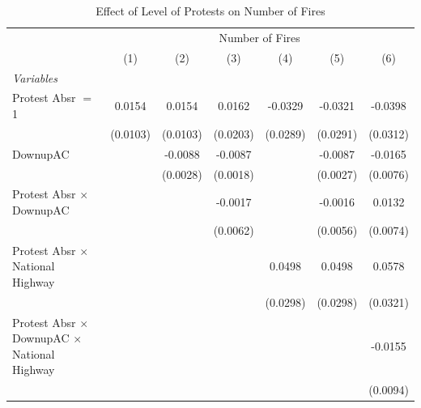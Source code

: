 
\begin{table}[htbp]
   \caption{\label{tab:protest_treat_main} Effect of Level of Protests on Number of Fires}
   \centering
   \begin{tabular}{lcccccc}
      \tabularnewline \midrule \midrule
       & \multicolumn{6}{c}{Number of Fires}\\
                                                                 & (1)           & (2)           & (3)           & (4)           & (5)           & (6)\\  
      \midrule
      \emph{Variables}\\
      Protest Absr $=$ 1                                         & 0.0154        & 0.0154        & 0.0162        & -0.0329       & -0.0321       & -0.0398\\   
                                                                 & (0.0103)      & (0.0103)      & (0.0203)      & (0.0289)      & (0.0291)      & (0.0312)\\   
      DownupAC                                                   &               & -0.0088       & -0.0087       &               & -0.0087       & -0.0165\\   
                                                                 &               & (0.0028)      & (0.0018)      &               & (0.0027)      & (0.0076)\\   
      Protest Absr $\times$ DownupAC                             &               &               & -0.0017       &               & -0.0016       & 0.0132\\   
                                                                 &               &               & (0.0062)      &               & (0.0056)      & (0.0074)\\   
      Protest Absr $\times$ National Highway                     &               &               &               & 0.0498        & 0.0498        & 0.0578\\   
                                                                 &               &               &               & (0.0298)      & (0.0298)      & (0.0321)\\   
      Protest Absr $\times$ DownupAC $\times$ National Highway   &               &               &               &               &               & -0.0155\\   
                                                                 &               &               &               &               &               & (0.0094)\\   

\end{tabular}
\end{table}
